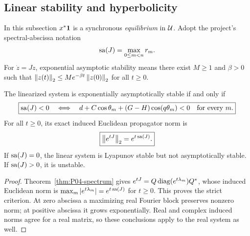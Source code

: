 \subsection{Linear stability and hyperbolicity}
\label{slot:P04-3}

In this subsection $x^*\mathbf{1}$ is a synchronous \emph{equilibrium}
in $\mathcal{U}$. Adopt the project's spectral-abscissa notation
\begin{equation}
 \operatorname{sa}(J)=\max_{0\le m<n}r_m.
 \label{eq:P04-abscissa}
\end{equation}
For $\dot z=Jz$, exponential asymptotic stability means there exist
$M\ge1$ and $\beta>0$ such that
$\left\lVert z(t)\right\rVert_2\le Me^{-\beta t}\left\lVert z(0)\right\rVert_2$ for all $t\ge0$.

\begin{corollary}
\label{cor:P04-stability}
The linearized system is exponentially asymptotically stable if and
only if
\begin{equation}
 \boxed{\operatorname{sa}(J)<0\quad\Longleftrightarrow\quad
   d+C\cos\theta_m+(G-H)\cos(q\theta_m)<0
      \quad\text{for every }m.}
 \label{eq:P04-stability}
\end{equation}
For all $t\ge0$, its exact induced Euclidean propagator norm is
\begin{equation}
 \boxed{\left\lVert e^{tJ}\right\rVert_2=e^{t\operatorname{sa}(J)}.}
 \label{eq:P04-semigroup}
\end{equation}
If $\operatorname{sa}(J)=0$, the linear system is Lyapunov stable but not
asymptotically stable. If $\operatorname{sa}(J)>0$, it is unstable.
\end{corollary}
\begin{proof}
Theorem~\ref{thm:P04-spectrum} gives
$e^{tJ}=Q\operatorname{diag}(e^{t\lambda_m})Q^*$, whose induced Euclidean norm
is $\max_m|e^{t\lambda_m}|=e^{t\operatorname{sa}(J)}$ for $t\ge0$.
This proves the strict criterion. At zero abscissa a maximizing real
Fourier block preserves nonzero norm; at positive abscissa it grows
exponentially. Real and complex induced norms agree for a real matrix,
so these conclusions apply to the real system as well.
\end{proof}

